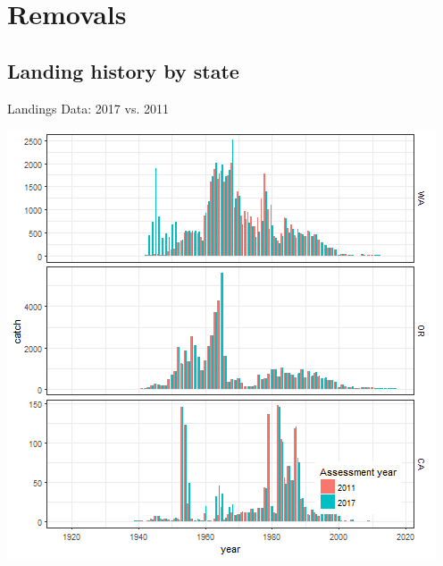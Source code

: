 \documentclass[pdf]{beamer}\usepackage[]{graphicx}\usepackage[]{color}
\begin{document}
\section{Removals}
\subsection{Landing history by state}
\begin{frame}{Landings Data: 2017 vs. 2011}
  \begin{center}
    \includegraphics[scale = 0.45]{figures/pop2017_2011vs2017catches_states.png}
  \end{center}
\end{frame}
\end{document}

